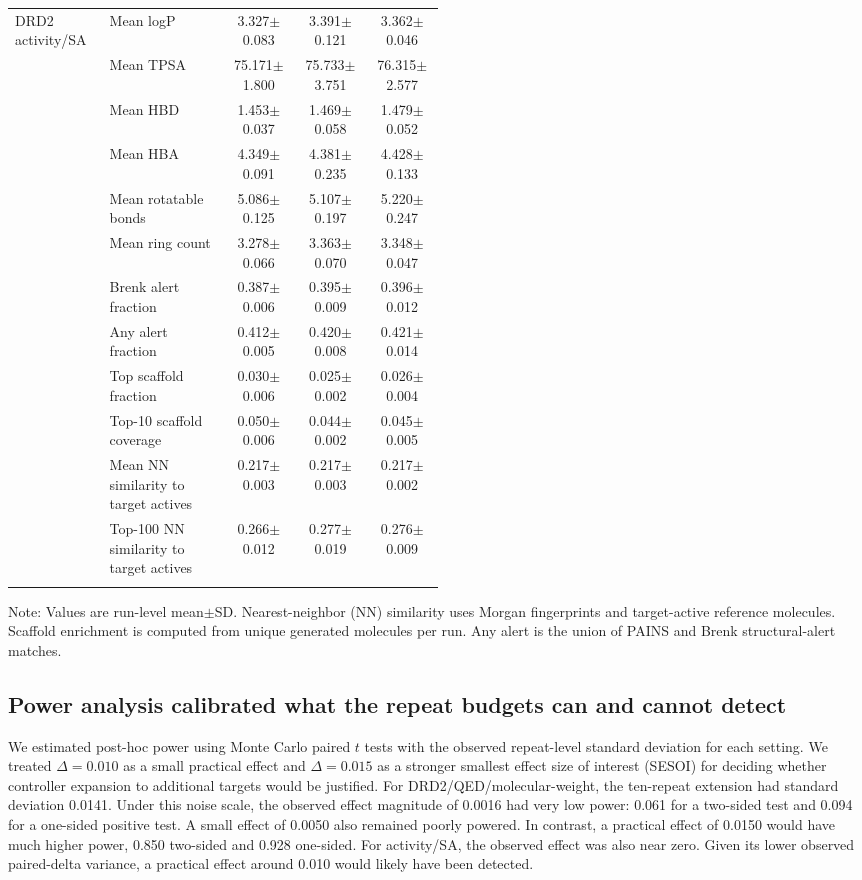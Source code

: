 \documentclass[referee,lineno,pdflatex,sn-basic]{sn-jnl}
\theoremstyle{thmstyleone}%
\theoremstyle{thmstyletwo}%
\theoremstyle{thmstylethree}%
\begin{document}
\begin{table}[h]
\begin{tabularx}{\linewidth}{@{}p{0.22\linewidth}p{0.28\linewidth}ccc@{}}
\addlinespace
DRD2 activity/SA & Mean logP & 3.327$\pm$0.083 & 3.391$\pm$0.121 & 3.362$\pm$0.046\\
 & Mean TPSA & 75.171$\pm$1.800 & 75.733$\pm$3.751 & 76.315$\pm$2.577\\
 & Mean HBD & 1.453$\pm$0.037 & 1.469$\pm$0.058 & 1.479$\pm$0.052\\
 & Mean HBA & 4.349$\pm$0.091 & 4.381$\pm$0.235 & 4.428$\pm$0.133\\
 & Mean rotatable bonds & 5.086$\pm$0.125 & 5.107$\pm$0.197 & 5.220$\pm$0.247\\
 & Mean ring count & 3.278$\pm$0.066 & 3.363$\pm$0.070 & 3.348$\pm$0.047\\
 & Brenk alert fraction & 0.387$\pm$0.006 & 0.395$\pm$0.009 & 0.396$\pm$0.012\\
 & Any alert fraction & 0.412$\pm$0.005 & 0.420$\pm$0.008 & 0.421$\pm$0.014\\
 & Top scaffold fraction & 0.030$\pm$0.006 & 0.025$\pm$0.002 & 0.026$\pm$0.004\\
 & Top-10 scaffold coverage & 0.050$\pm$0.006 & 0.044$\pm$0.002 & 0.045$\pm$0.005\\
 & Mean NN similarity to target actives & 0.217$\pm$0.003 & 0.217$\pm$0.003 & 0.217$\pm$0.002\\
 & Top-100 NN similarity to target actives & 0.266$\pm$0.012 & 0.277$\pm$0.019 & 0.276$\pm$0.009\\
\addlinespace
\botrule
\end{tabularx}
\vspace{2pt}
\raggedright
\footnotesize
Note: Values are run-level mean$\pm$SD. Nearest-neighbor (NN) similarity uses Morgan fingerprints and target-active reference molecules. Scaffold enrichment is computed from unique generated molecules per run. Any alert is the union of PAINS and Brenk structural-alert matches.
\end{table}

\subsection{Power analysis calibrated what the repeat budgets can and cannot detect}\label{subsec:power}

We estimated post-hoc power using Monte Carlo paired $t$ tests with the observed repeat-level standard deviation for each setting. We treated $\Delta=0.010$ as a small practical effect and $\Delta=0.015$ as a stronger smallest effect size of interest (SESOI) for deciding whether controller expansion to additional targets would be justified. For DRD2/QED/molecular-weight, the ten-repeat extension had standard deviation 0.0141. Under this noise scale, the observed effect magnitude of 0.0016 had very low power: 0.061 for a two-sided test and 0.094 for a one-sided positive test. A small effect of 0.0050 also remained poorly powered. In contrast, a practical effect of 0.0150 would have much higher power, 0.850 two-sided and 0.928 one-sided. For activity/SA, the observed effect was also near zero. Given its lower observed paired-delta variance, a practical effect around 0.010 would likely have been detected.
\end{document}
